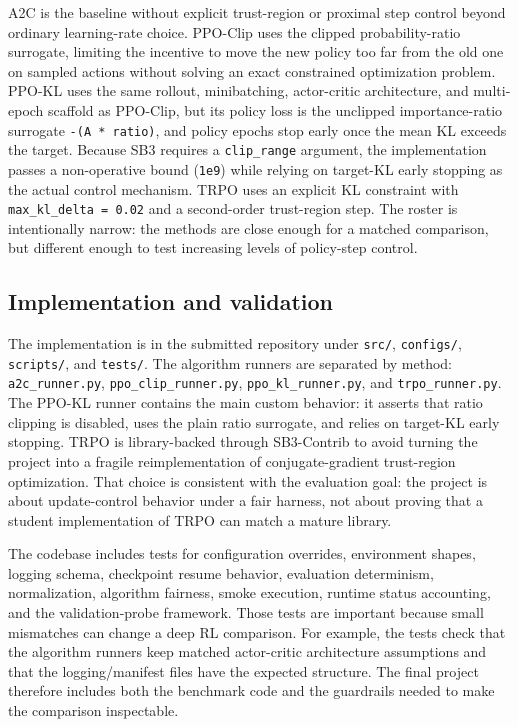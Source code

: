 \documentclass{article}
\begin{document}
A2C is the baseline without explicit trust-region or proximal step control beyond ordinary learning-rate choice. PPO-Clip uses the clipped probability-ratio surrogate, limiting the incentive to move the new policy too far from the old one on sampled actions without solving an exact constrained optimization problem. PPO-KL uses the same rollout, minibatching, actor-critic architecture, and multi-epoch scaffold as PPO-Clip, but its policy loss is the unclipped importance-ratio surrogate \texttt{-(A * ratio)}, and policy epochs stop early once the mean KL exceeds the target. Because SB3 requires a \texttt{clip\_range} argument, the implementation passes a non-operative bound (\texttt{1e9}) while relying on target-KL early stopping as the actual control mechanism. TRPO uses an explicit KL constraint with \texttt{max\_kl\_delta = 0.02} and a second-order trust-region step. The roster is intentionally narrow: the methods are close enough for a matched comparison, but different enough to test increasing levels of policy-step control.

\subsection{Implementation and validation}

The implementation is in the submitted repository under \texttt{src/}, \texttt{configs/}, \texttt{scripts/}, and \texttt{tests/}. The algorithm runners are separated by method: \texttt{a2c\_runner.py}, \texttt{ppo\_clip\_runner.py}, \texttt{ppo\_kl\_runner.py}, and \texttt{trpo\_runner.py}. The PPO-KL runner contains the main custom behavior: it asserts that ratio clipping is disabled, uses the plain ratio surrogate, and relies on target-KL early stopping. TRPO is library-backed through SB3-Contrib to avoid turning the project into a fragile reimplementation of conjugate-gradient trust-region optimization. That choice is consistent with the evaluation goal: the project is about update-control behavior under a fair harness, not about proving that a student implementation of TRPO can match a mature library.

The codebase includes tests for configuration overrides, environment shapes, logging schema, checkpoint resume behavior, evaluation determinism, normalization, algorithm fairness, smoke execution, runtime status accounting, and the validation-probe framework. Those tests are important because small mismatches can change a deep RL comparison. For example, the tests check that the algorithm runners keep matched actor-critic architecture assumptions and that the logging/manifest files have the expected structure. The final project therefore includes both the benchmark code and the guardrails needed to make the comparison inspectable.
\end{document}
